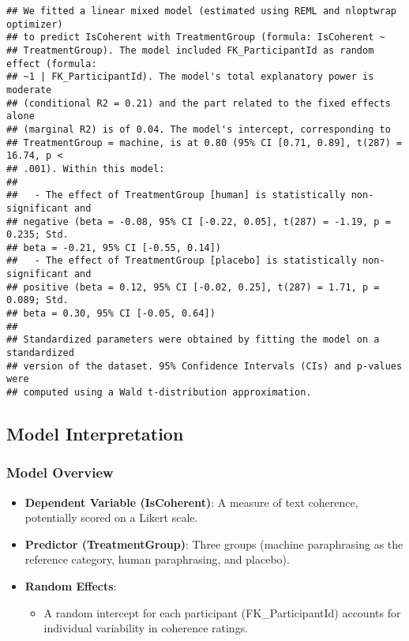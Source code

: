 \documentclass[
]{article}
\providecommand{\tightlist}{%
  \setlength{\itemsep}{0pt}\setlength{\parskip}{0pt}}
\begin{document}
\begin{verbatim}
## We fitted a linear mixed model (estimated using REML and nloptwrap optimizer)
## to predict IsCoherent with TreatmentGroup (formula: IsCoherent ~
## TreatmentGroup). The model included FK_ParticipantId as random effect (formula:
## ~1 | FK_ParticipantId). The model's total explanatory power is moderate
## (conditional R2 = 0.21) and the part related to the fixed effects alone
## (marginal R2) is of 0.04. The model's intercept, corresponding to
## TreatmentGroup = machine, is at 0.80 (95% CI [0.71, 0.89], t(287) = 16.74, p <
## .001). Within this model:
## 
##   - The effect of TreatmentGroup [human] is statistically non-significant and
## negative (beta = -0.08, 95% CI [-0.22, 0.05], t(287) = -1.19, p = 0.235; Std.
## beta = -0.21, 95% CI [-0.55, 0.14])
##   - The effect of TreatmentGroup [placebo] is statistically non-significant and
## positive (beta = 0.12, 95% CI [-0.02, 0.25], t(287) = 1.71, p = 0.089; Std.
## beta = 0.30, 95% CI [-0.05, 0.64])
## 
## Standardized parameters were obtained by fitting the model on a standardized
## version of the dataset. 95% Confidence Intervals (CIs) and p-values were
## computed using a Wald t-distribution approximation.
\end{verbatim}

\subsection{\texorpdfstring{\textbf{Model
Interpretation}}{Model Interpretation}}\label{model-interpretation-5}

\subsubsection{\texorpdfstring{\textbf{Model
Overview}}{Model Overview}}\label{model-overview-5}

\begin{itemize}
\tightlist
\item
  \textbf{Dependent Variable (IsCoherent)}: A measure of text coherence,
  potentially scored on a Likert scale.
\item
  \textbf{Predictor (TreatmentGroup)}: Three groups (machine
  paraphrasing as the reference category, human paraphrasing, and
  placebo).
\item
  \textbf{Random Effects}:

  \begin{itemize}
  \tightlist
  \item
    A random intercept for each participant (FK\_ParticipantId) accounts
    for individual variability in coherence ratings.
  \end{itemize}
\end{itemize}
\end{document}
